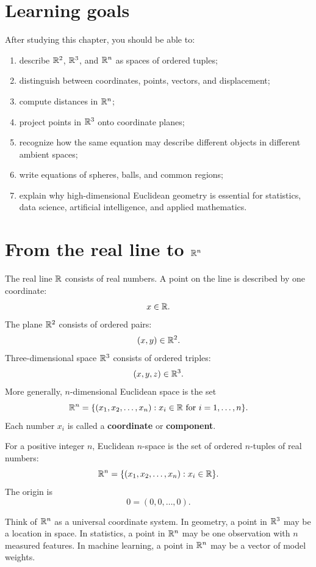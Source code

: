 \section*{Learning goals}

After studying this chapter, you should be able to:
\begin{enumerate}
  \item describe $\mathbb{R}^2$, $\mathbb{R}^3$, and $\mathbb{R}^n$ as spaces of ordered tuples;
  \item distinguish between coordinates, points, vectors, and displacement;
  \item compute distances in $\mathbb{R}^n$;
  \item project points in $\mathbb{R}^3$ onto coordinate planes;
  \item recognize how the same equation may describe different objects in different ambient spaces;
  \item write equations of spheres, balls, and common regions;
  \item explain why high-dimensional Euclidean geometry is essential for statistics, data science, artificial intelligence, and applied mathematics.
\end{enumerate}

\section{From the real line to $\mathbb{R}^n$}

The real line $\mathbb{R}$ consists of real numbers. A point on the line is described by one coordinate:
\[
  x\in\mathbb{R}.
\]
The plane $\mathbb{R}^2$ consists of ordered pairs:
\[
  (x,y)\in\mathbb{R}^2.
\]
Three-dimensional space $\mathbb{R}^3$ consists of ordered triples:
\[
  (x,y,z)\in\mathbb{R}^3.
\]
More generally, $n$-dimensional Euclidean space is the set
\[
  \mathbb{R}^n=\{(x_1,x_2,\ldots,x_n):x_i\in\mathbb{R}\text{ for }i=1,\ldots,n\}.
\]
Each number $x_i$ is called a \textbf{coordinate} or \textbf{component}.

\begin{definitionbox}[title={Euclidean space}]
For a positive integer $n$, Euclidean $n$-space is the set of ordered $n$-tuples of real numbers:
\[
  \mathbb{R}^n=\{(x_1,x_2,\ldots,x_n):x_i\in\mathbb{R}\}.
\]
The origin is
\[
  0=(0,0,\ldots,0).
\]
\end{definitionbox}

\begin{notebox}[title={A useful mental model}]
Think of $\mathbb{R}^n$ as a universal coordinate system. In geometry, a point in $\mathbb{R}^3$ may be a location in space. In statistics, a point in $\mathbb{R}^n$ may be one observation with $n$ measured features. In machine learning, a point in $\mathbb{R}^n$ may be a vector of model weights.
\end{notebox}

